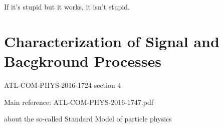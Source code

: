 \begin{savequote}[75mm]
If it's stupid but it works, it isn't stupid.
\end{savequote}

\chapter{Characterization of Signal and Bacgkround Processes}
ATL-COM-PHYS-2016-1724 section 4

Main reference: ATL-COM-PHYS-2016-1747.pdf \cite{modelingnote}

 about the so-called Standard Model of particle physics


